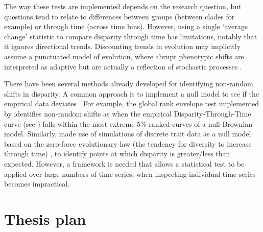 \documentclass[titlepage]{article}
\begin{document}
The way these tests are implemented depends on the research question, but questions tend to relate to differences between groups (between clades for example) or through time (across time bins).
However, using a single `average change' statistic to compare disparity through time has limitations, notably that it ignores directional trends.
Discounting trends in evolution may implicitly assume a punctuated model of evolution, where abrupt phenotypic shifts are interpreted as adaptive but are actually a reflection of stochastic processes \citep{hunt2015simple,pagel2022general}.

There have been several methods already developed for identifying non-random shifts in disparity.
A common approach is to implement a null model to see if the empirical data deviates \citep{freckleton2006detecting, murrell2018global}. 
For example, the global rank envelope test implemented by \cite{murrell2018global} identifies non-random shifts as when the empirical Disparity-Through-Time curve (see \cite{harmon2003tempo}) falls within the most extreme 5\% ranked curves of a null Brownian model.
Similarly, \cite{smith2022evolution} made use of simulations of discrete trait data as a null model based on the zero-force evolutionary law (the tendency for diversity to increase through time) \citep{mcshea2010biology}, to identify points at which disparity is greater/less than expected.
However, a framework is needed that allows a statistical test to be applied over large numbers of time series, when inspecting individual time series becomes impractical.





\part{Thesis plan}
\end{document}
